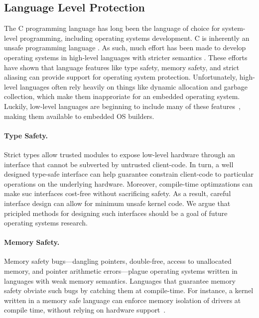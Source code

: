 \subsection{Language Level Protection}

The C programming language has long been the language of choice for system-level
programming, including operating systems development. C is inherently an unsafe
programming language \cite{kint:osdi2012, undefined:apsys2012}. As such, much
effort has been made to develop operating systems in high-level languages with
stricter semantics \cite{singularity:sigops, house:icfp2005, unikernels:2013}.
These efforts have shown that language features like type safety, memory safety,
and strict aliasing can provide support for operating system protection.
Unfortunately, high-level languages often rely heavily on things like dynamic
allocation and garbage collection, which make them inapproriate for an embedded
operating system. Luckily, low-level languages are beginning to include many of
these features~\cite{c++14,rust}, making them available to embedded OS builders.

\paragraph{Type Safety.}
Strict types allow trusted modules to expose low-level hardware through an
interface that cannot be subverted by untrusted client-code. In turn, a well
designed type-safe interface can help guarantee constrain client-code to
particular operations on the underlying hardware. Moreover, compile-time
optimzations can make suc interfaces cost-free without sacrificing safety. As a
result, careful interface design can allow for minimum unsafe kernel code. We
argue that pricipled methods for designing such interfaces should be a goal of
future operating systems research.

\paragraph{Memory Safety.}
Memory safety bugs---dangling pointers, double-free, access to unallocated
memory, and pointer arithmetic errors---plague operating systems
written in languages with weak memory semantics.
Languages that guarantee memory safety obviate such bugs by catching them at
compile-time.
For instance, a kernel written in a memory safe language can enforce memory
isolation of drivers at compile time, without relying on hardware
support~\cite{spin:sosp}.

